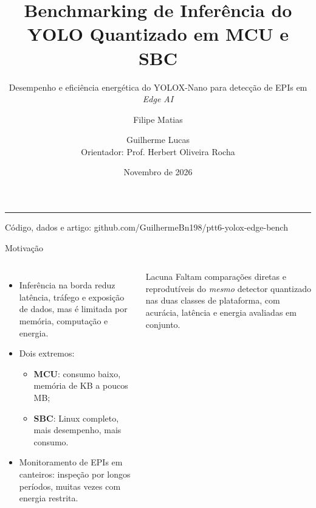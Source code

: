 \documentclass[aspectratio=169,11pt]{beamer}
\title{Benchmarking de Inferência do YOLO Quantizado em MCU e SBC}
\subtitle{Desempenho e eficiência energética do YOLOX-Nano para detecção de EPIs em \emph{Edge AI}}
\author{Filipe Matias \and Guilherme Lucas\\[2pt]{\small Orientador: Prof. Herbert Oliveira Rocha}}
\institute{\small PPCA, Universidade Federal de Roraima\\Arquitetura e Organização de Computadores}
\date{\small Novembro de 2026}
\newcommand{\mcu}{\textcolor{roxo}{\textbf{MCU}}}
\newcommand{\sbc}{\textcolor{azul}{\textbf{SBC}}}
\begin{document}
{
\begin{frame}
\vspace{0.6cm}
{\color{azul}\LARGE\bfseries \inserttitle\par}
\vspace{0.2cm}
{\large \insertsubtitle\par}
\vspace{0.3cm}
{\color{azul}\rule{\linewidth}{0.8pt}}
\vspace{0.4cm}

\insertauthor\par
\vspace{0.3cm}
{\color{cinza}\insertinstitute\par\vspace{0.1cm}\insertdate\par\vspace{0.2cm}\small Código, dados e artigo: github.com/GuilhermeBn198/ptt6-yolox-edge-bench}
\end{frame}}

\begin{frame}{Motivação}
\begin{columns}[T]
\begin{itemize}
\item Inferência na borda reduz latência, tráfego e exposição de dados, mas é limitada por memória, computação e energia.
\item Dois extremos:
  \begin{itemize}
  \item \mcu: consumo baixo, memória de KB a poucos MB;
  \item \sbc: Linux completo, mais desempenho, mais consumo.
  \end{itemize}
\item Monitoramento de EPIs em canteiros: inspeção por longos períodos, muitas vezes com energia restrita.
\end{itemize}
\begin{block}{Lacuna}
Faltam comparações diretas e reprodutíveis do \emph{mesmo} detector quantizado nas duas classes de plataforma, com
acurácia, latência e energia avaliadas em conjunto.
\end{block}
\end{columns}
\end{frame}
\end{document}
